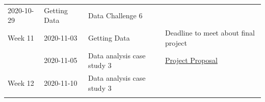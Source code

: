 \documentclass[
]{book}
\begin{document}
\begin{longtable}[]{@{}llll@{}}
\begin{minipage}[t]{0.22\columnwidth}
2020-10-29\strut
\end{minipage} & \begin{minipage}[t]{0.22\columnwidth}\raggedright
Getting Data\strut
\end{minipage} & \begin{minipage}[t]{0.22\columnwidth}\raggedright
Data Challenge 6\strut
\end{minipage}\tabularnewline
\begin{minipage}[t]{0.22\columnwidth}\raggedright
Week 11\strut
\end{minipage} & \begin{minipage}[t]{0.22\columnwidth}\raggedright
2020-11-03\strut
\end{minipage} & \begin{minipage}[t]{0.22\columnwidth}\raggedright
Getting Data\strut
\end{minipage} & \begin{minipage}[t]{0.22\columnwidth}\raggedright
Deadline to meet about final project\strut
\end{minipage}\tabularnewline
\begin{minipage}[t]{0.22\columnwidth}\raggedright
\strut
\end{minipage} & \begin{minipage}[t]{0.22\columnwidth}\raggedright
2020-11-05\strut
\end{minipage} & \begin{minipage}[t]{0.22\columnwidth}\raggedright
Data analysis case study 3\strut
\end{minipage} & \begin{minipage}[t]{0.22\columnwidth}\raggedright
\href{final_project_docs/esoc214_project_proposal.pdf}{Project Proposal}\strut
\end{minipage}\tabularnewline
\begin{minipage}[t]{0.22\columnwidth}\raggedright
Week 12\strut
\end{minipage} & \begin{minipage}[t]{0.22\columnwidth}\raggedright
2020-11-10\strut
\end{minipage} & \begin{minipage}[t]{0.22\columnwidth}\raggedright
Data analysis case study 3\strut
\end{minipage} & \begin{minipage}[t]{0.22\columnwidth}\raggedright
\strut
\end{minipage}\tabularnewline
\begin{minipage}[t]{0.22\columnwidth}\raggedright

\end{minipage}
\end{longtable}
\end{document}
